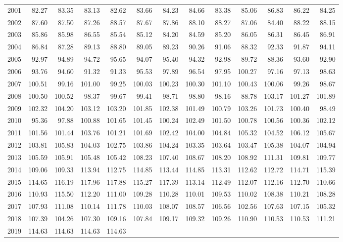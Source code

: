 \begin{longtable}{rrrrrrrrrrrrr}
  2001 & 82.27 & 83.35 & 83.13 & 82.62 & 83.66 & 84.23 & 84.66 & 83.38 & 85.06 & 86.83 & 86.22 & 84.25 \\ 
  2002 & 87.60 & 87.50 & 87.26 & 88.57 & 87.67 & 87.86 & 88.10 & 88.27 & 87.06 & 84.40 & 88.22 & 88.15 \\ 
  2003 & 85.86 & 85.98 & 86.55 & 85.54 & 85.12 & 84.20 & 84.59 & 85.20 & 86.05 & 86.31 & 86.45 & 86.91 \\ 
  2004 & 86.84 & 87.28 & 89.13 & 88.80 & 89.05 & 89.23 & 90.26 & 91.06 & 88.32 & 92.33 & 91.87 & 94.11 \\ 
  2005 & 92.97 & 94.89 & 94.72 & 95.65 & 94.07 & 95.40 & 94.32 & 92.98 & 89.72 & 88.36 & 93.60 & 92.90 \\ 
  2006 & 93.76 & 94.60 & 91.32 & 91.33 & 95.53 & 97.89 & 96.54 & 97.95 & 100.27 & 97.16 & 97.13 & 98.63 \\ 
  2007 & 100.51 & 99.16 & 101.00 & 99.25 & 100.03 & 100.23 & 100.30 & 101.10 & 100.43 & 100.06 & 99.26 & 98.67 \\ 
  2008 & 100.50 & 100.52 & 98.37 & 99.67 & 99.41 & 98.71 & 98.80 & 98.16 & 88.78 & 103.17 & 101.27 & 101.89 \\ 
  2009 & 102.32 & 104.20 & 103.12 & 103.20 & 101.85 & 102.38 & 101.49 & 100.79 & 103.26 & 101.73 & 100.40 & 98.49 \\ 
  2010 & 95.36 & 97.88 & 100.88 & 101.65 & 101.45 & 100.24 & 102.49 & 101.50 & 100.78 & 100.56 & 100.36 & 102.12 \\ 
  2011 & 101.56 & 101.44 & 103.76 & 101.21 & 101.69 & 102.42 & 104.00 & 104.84 & 105.32 & 104.52 & 106.12 & 105.67 \\ 
  2012 & 103.81 & 105.83 & 104.03 & 102.75 & 103.86 & 104.24 & 103.35 & 103.64 & 103.47 & 105.38 & 104.07 & 104.94 \\ 
  2013 & 105.59 & 105.91 & 105.48 & 105.42 & 108.23 & 107.40 & 108.67 & 108.20 & 108.92 & 111.31 & 109.81 & 109.77 \\ 
  2014 & 109.06 & 109.33 & 113.94 & 112.75 & 114.85 & 113.44 & 114.85 & 113.31 & 112.62 & 112.72 & 114.71 & 115.39 \\ 
  2015 & 114.65 & 116.19 & 117.96 & 117.88 & 115.27 & 117.39 & 113.14 & 112.49 & 112.07 & 112.16 & 112.70 & 110.66 \\ 
  2016 & 110.93 & 115.50 & 112.20 & 111.00 & 109.28 & 110.28 & 110.01 & 109.53 & 110.02 & 108.38 & 110.21 & 108.28 \\ 
  2017 & 107.93 & 111.08 & 110.14 & 111.78 & 110.03 & 108.07 & 108.57 & 106.56 & 102.56 & 107.63 & 107.15 & 105.32 \\ 
  2018 & 107.39 & 104.26 & 107.30 & 109.16 & 107.84 & 109.17 & 109.32 & 109.26 & 110.90 & 110.53 & 110.53 & 111.21 \\ 
  2019 & 114.63 & 114.63 & 114.63 & 114.63 &  &  &  &  &  &  &  &  \\ 
   \hline
\hline
\end{longtable}

